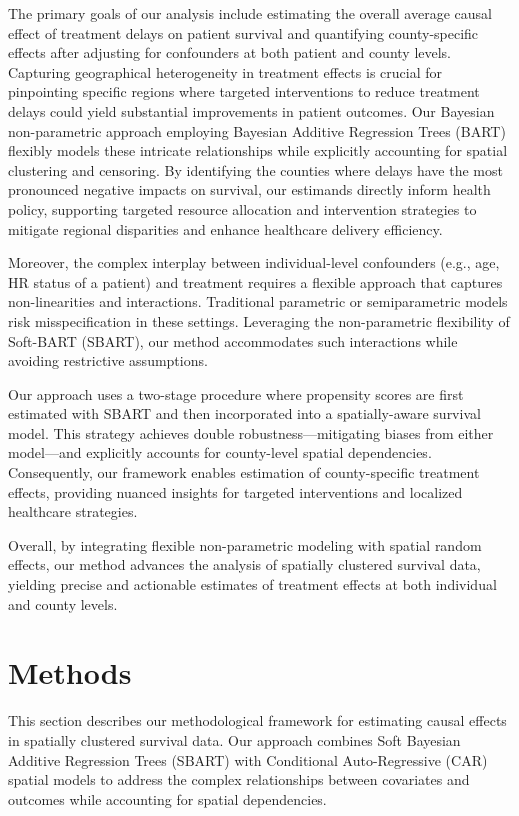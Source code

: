 \documentclass[useAMS,referee]{biom}
\begin{document}
The primary goals of our analysis include estimating the overall average causal effect of treatment delays on patient survival and quantifying county-specific effects after adjusting for confounders at both patient and county levels. Capturing geographical heterogeneity in treatment effects is crucial for pinpointing specific regions where targeted interventions to reduce treatment delays could yield substantial improvements in patient outcomes. Our Bayesian non-parametric approach employing Bayesian Additive Regression Trees (BART) flexibly models these intricate relationships while explicitly accounting for spatial clustering and censoring. By identifying the counties where delays have the most pronounced negative impacts on survival, our estimands directly inform health policy, supporting targeted resource allocation and intervention strategies to mitigate regional disparities and enhance healthcare delivery efficiency.

Moreover, the complex interplay between individual-level confounders (e.g., age, HR status of a patient) and treatment requires a flexible approach that captures non-linearities and interactions. Traditional parametric or semiparametric models risk misspecification in these settings. Leveraging the non-parametric flexibility of Soft-BART (SBART), our method accommodates such interactions while avoiding restrictive assumptions.

Our approach uses a two-stage procedure where propensity scores are first estimated with SBART and then incorporated into a spatially-aware survival model. This strategy achieves double robustness—mitigating biases from either model—and explicitly accounts for county-level spatial dependencies. Consequently, our framework enables estimation of county-specific treatment effects, providing nuanced insights for targeted interventions and localized healthcare strategies.

Overall, by integrating flexible non-parametric modeling with spatial random effects, our method advances the analysis of spatially clustered survival data, yielding precise and actionable estimates of treatment effects at both individual and county levels.




\section{Methods}

This section describes our methodological framework for estimating causal effects in spatially clustered survival data. Our approach combines Soft Bayesian Additive Regression Trees (SBART) with Conditional Auto-Regressive (CAR) spatial models to address the complex relationships between covariates and outcomes while accounting for spatial dependencies.
\end{document}
